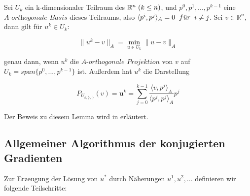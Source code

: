 Sei $U_{k}$ ein k-dimensionaler Teilraum des $\mathbb{R}^{n} \hspace{1mm} (k \le n)$, und $p^{0}, p^{1},...,p^{k-1}$ eine $\textit{A-orthogonale Basis}$ dieses Teilraums, also $\langle p^{i}, p^{j} \rangle _{A} = 0 \hspace{2mm} f\ddot{u}r \hspace{2mm} i \ne j$. Sei $v \in \mathbb{R}^{n}$, dann gilt für $u^{k} \in U_{k}$:

\begin{equation}
\|u^{k} - v\|_{A} = \underset{u \in U_{k}}{\min} \|u - v\|_{A}
\end{equation}

genau dann, wenn $u^{k}$ die $\textit{A-orthogonale Projektion}$ von $v$ auf $U_{k} = span\{p^{0},...,p^{k-1}\}$ ist. Außerdem hat $u^{k}$ die Darstellung

\begin{equation}
P_{U_{k,\langle \cdot,\cdot \rangle}}(v) = \textbf{u}^{k} = \sum_{j=0}^{k-1} \frac {\langle v, p^{j} \rangle _{A}} {\langle p^{j}, p^{j} \rangle _{A}} p^{j}
\end{equation}

Der Beweis zu diesem Lemma wird in \cite{DR7} erläutert.

\subsection{Allgemeiner Algorithmus der konjugierten Gradienten}\label{ss.Allgemeiner CG-Algorithmus}

Zur Erzeugung der Lösung von $u^{*}$ durch Näherungen $u^{1}, u^{2},...$ definieren wir folgende Teilschritte:


